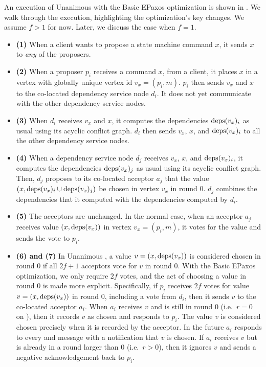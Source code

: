 An execution of Unanimous \BPaxos{} with the Basic EPaxos optimization is shown
in . We walk through the execution, highlighting the
optimization's key changes. We assume $f > 1$ for now. Later, we discuss the
case when $f = 1$.
\begin{itemize}
  \item \textbf{(1)}
    When a client wants to propose a state machine command $x$, it sends $x$ to
    \emph{any} of the proposers.

  \item \textbf{(2)}
    When a proposer $p_i$ receives a command $x$, from a client, it places $x$
    in a vertex with globally unique vertex id $v_x = (p_i, m)$.
    \change{} $p_i$ then sends $v_x$ and $x$ to the co-located dependency
    service node $d_i$. It does not yet communicate with the other dependency
    service nodes.

  \item \textbf{(3)}
    \change{} When $d_i$ receives $v_x$ and $x$, it computes the
    dependencies $\text{deps}(v_x)_i$ as usual using its acyclic conflict graph.
    $d_i$ then sends $v_x$, $x$, and $\text{deps}(v_x)_i$ to all the other dependency
    service nodes.

  \item \textbf{(4)}
    When a dependency service node $d_j$ receives $v_x$, $x$, and
    $\text{deps}(v_x)_i$, it computes the dependencies $\text{deps}(v_x)_j$ as usual using
    its acyclic conflict graph. \change{} Then, $d_j$ proposes to its
    co-located acceptor $a_j$ that the value $(x, \text{deps}(v_x)_i \cup
    \text{deps}(v_x)_j)$ be chosen in vertex $v_x$ in round $0$. $d_j$ combines the
    dependencies that it computed with the dependencies computed by $d_i$.

  \item \textbf{(5)}
    The acceptors are unchanged. In the normal case, when an acceptor $a_j$
    receives value $(x, \text{deps}(v_x))$ in vertex $v_x = (p_i, m)$, it votes for
    the value and sends the vote to $p_i$.

  \item \textbf{(6) and (7)}
    \change{} In Unanimous \BPaxos{}, a value $v = (x, \text{deps}(v_x))$ is
    considered chosen in round $0$ if all $2f+1$ acceptors vote for $v$ in
    round $0$. With the Basic EPaxos optimization, we only require $2f$ votes,
    and the act of choosing a value in round $0$ is made more explicit.
    Specifically, if $p_i$ receives $2f$ votes for value $v = (x, \text{deps}(v_x))$
    in round $0$, including a vote from $d_i$, then it sends $v$ to the
    co-located acceptor $a_i$. When $a_i$ receives $v$ and is still in round
    $0$ (i.e.\ $r = 0$ on  ),
    then it records $v$ as chosen and responds to $p_i$. The value $v$ is
    considered chosen precisely when it is recorded by the acceptor. In the
    future $a_i$ responds to every  and 
    message with a notification that $v$ is chosen. If $a_i$ receives $v$ but
    is already in a round larger than $0$ (i.e.\ $r > 0$), then it ignores $v$
    and sends a negative acknowledgement back to $p_i$.


\end{itemize}
